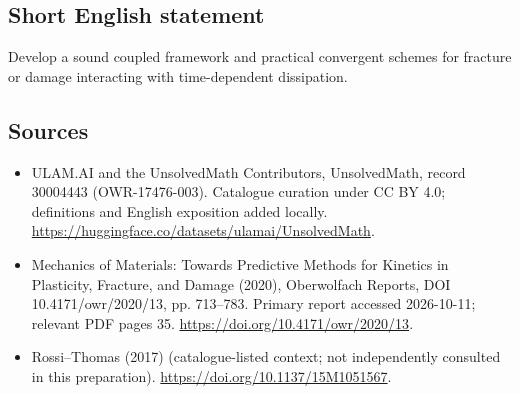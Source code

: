 \documentclass[11pt]{article}
\begin{document}
\subsection{Short English statement}
Develop a sound coupled framework and practical convergent schemes for fracture or damage interacting with time-dependent dissipation.
\subsection{Sources}
\begin{itemize}
\item[\hypertarget{source:30004443:1}{S1}] ULAM.AI and the UnsolvedMath Contributors, UnsolvedMath, record 30004443 (OWR-17476-003). Catalogue curation under CC BY 4.0; definitions and English exposition added locally.
\url{https://huggingface.co/datasets/ulamai/UnsolvedMath}.
\item[\hypertarget{source:30004443:2}{S2}] Mechanics of Materials: Towards Predictive Methods for Kinetics in Plasticity, Fracture, and Damage (2020), Oberwolfach Reports, DOI 10.4171/owr/2020/13, pp. 713--783. Primary report accessed 2026-10-11; relevant PDF pages 35.
\url{https://doi.org/10.4171/owr/2020/13}.
\item[\hypertarget{source:30004443:3}{S3}] Rossi--Thomas (2017) (catalogue-listed context; not independently consulted in this preparation).
\url{https://doi.org/10.1137/15M1051567}.
\end{itemize}
\label{end:30004443}
\end{document}
